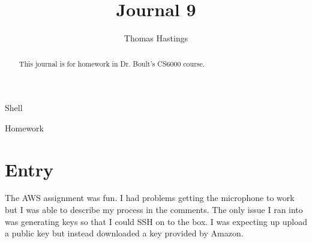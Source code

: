 \documentclass[journal]{IEEEtran}
\begin{document}
  \title{Journal 9}
  \author{Thomas Hastings}%
  
  {Shell}
  \maketitle
  
  \begin{abstract}
  This journal is for homework in Dr. Boult's CS6000 course.
  \end{abstract}
  
  \begin{IEEEkeywords}
  Homework
  \end{IEEEkeywords}
  
  
  \section{Entry}
  The AWS assignment was fun. I had problems getting the microphone to work but I was able to describe my process in the comments. The only issue I ran into was generating keys so that I could SSH on to the box. I was expecting up upload a public key but instead downloaded a key provided by Amazon. 

  
  
\end{document}
